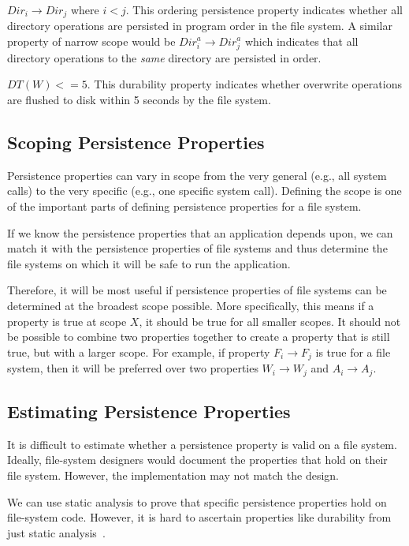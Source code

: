 $Dir_i \to Dir_j$ where $i < j$. This ordering persistence property indicates
whether all directory operations are persisted in program order in the file
system. A similar property of narrow scope would be ${Dir}^{a}_i \to
{Dir}^{a}_j$ which indicates that all directory operations to the
\textit{same} directory are persisted in order.  

$DT(W) <= 5$. This durability property indicates whether overwrite operations
are flushed to disk within 5 seconds by the file system. 
\fi

\subsection{Scoping Persistence Properties}
Persistence properties can vary in scope from the very general (e.g., all
system calls) to the very specific (e.g., one specific system call). Defining
the scope is one of the important parts of defining persistence properties for
a file system.

If we know the persistence properties that an application depends upon, we can
match it with the persistence properties of file systems and thus determine the
file systems on which it will be safe to run the application.

Therefore, it will be most useful if persistence properties of file systems can
be determined at the broadest scope possible. More specifically, this means if
a property is true at scope $X$, it should be true for all smaller scopes. It
should not be possible to combine two properties together to create a property
that is still true, but with a larger scope. For example, if property $F_{i}
\to F_{j}$ is true for a file system, then it will be preferred over two
properties $W_{i} \to W_{j}$ and $A_{i} \to A_{j}$.

\subsection{Estimating Persistence Properties}
\label{sec-framework}

It is difficult to estimate whether a persistence property is valid on a file
system. Ideally, file-system designers would document the properties that hold
on their file system. However, the implementation may not match the design.

We can use static analysis to prove that specific persistence properties hold
on file-system code. However, it is hard to ascertain properties like
durability from just static analysis~\cite{YangEtAl06-Explode}.   

